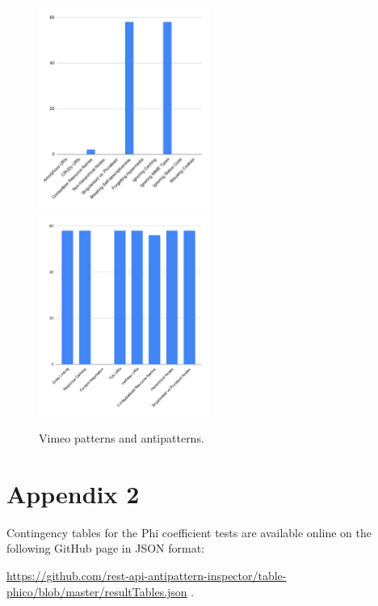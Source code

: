 \begin{figure}[htb!]

\includegraphics[width=0.5\textwidth]{img/barchart/vimeoBarAnti.pdf}
\includegraphics[width=0.5\textwidth]{img/barchart/vimeoBarPatt.pdf}
\caption{Vimeo patterns and antipatterns.}
\label{fig:vimeoBarPatt}

\end{figure}

\clearpage
\newpage

\section{Appendix 2}

Contingency tables for the Phi coefficient tests are available online on the following GitHub page in JSON format:

\url{https://github.com/rest-api-antipattern-inspector/table-phico/blob/master/resultTables.json} .